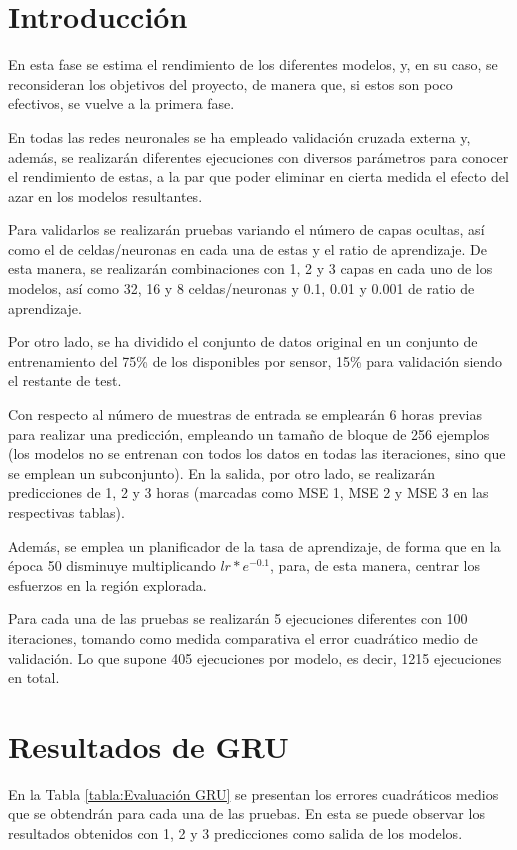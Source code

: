 
\section{Introducción}
En esta fase se estima el rendimiento de los diferentes modelos, y, en su caso, 
se reconsideran los objetivos del proyecto, de manera que, si estos son poco efectivos,
se vuelve a la primera fase.

En todas las redes neuronales se ha empleado validación cruzada externa y, además, se realizarán
diferentes ejecuciones con diversos parámetros para conocer el rendimiento de estas, a 
la par que poder eliminar en cierta medida el efecto del azar en los modelos 
resultantes.

Para validarlos se realizarán pruebas variando el número de capas
ocultas, así como el de celdas/neuronas en cada una de estas y el ratio de aprendizaje.
De esta manera, se realizarán combinaciones con 1, 2 y 3 capas en cada uno de los modelos, 
así como 32, 16 y 8 celdas/neuronas y 0.1, 0.01 y 0.001 de ratio de aprendizaje. 

Por otro lado, se ha dividido el conjunto de datos original en un conjunto de entrenamiento del 75\% de los disponibles
por sensor, 15\% para validación siendo el restante de test.

Con respecto al número de muestras de entrada se emplearán 6 horas previas para realizar
una predicción, empleando un tamaño de bloque de 256 ejemplos (los modelos 
no se entrenan con todos los datos en todas las iteraciones, sino que se emplean un subconjunto).
En la salida, por otro lado, se realizarán predicciones de 1, 2 y 3 horas (marcadas como MSE 1, MSE 2 y MSE 3 en las
respectivas tablas).

Además, se emplea un planificador de la tasa de aprendizaje, de forma
que en la época 50 disminuye multiplicando \(lr * e^{-0.1}\), para, de esta manera,
centrar los esfuerzos en la región explorada.

Para cada una de las pruebas se realizarán 5 ejecuciones diferentes con 100 iteraciones, 
tomando como medida comparativa el error cuadrático medio de validación.
Lo que supone 405 ejecuciones por modelo, es decir, 1215 ejecuciones en total.

\newpage

\section{Resultados de GRU}
En la Tabla \ref{tabla:Evaluación GRU} se presentan los errores cuadráticos medios
que se obtendrán para cada una de las pruebas. En esta se puede observar los resultados obtenidos con 1, 2 y 3 predicciones 
como salida de los modelos. 

